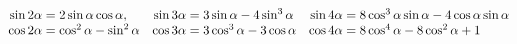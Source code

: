 \documentclass{article}
\begin{document}
\[ \begin{array}{@{}r@{\;=\;}l@{\quad}r@{\;=\;}l@{\quad}r@{\;=\;}l@{}}
    \sin2\alpha & 2\sin\alpha\cos\alpha, &
    \sin3\alpha & 3\sin\alpha-4\sin^3\alpha &
    \sin4\alpha & 8\cos^3\alpha\sin\alpha - 4\cos\alpha\sin\alpha\\
    \cos2\alpha & \cos^2\alpha - \sin^2\alpha &
    \cos3\alpha & 3\cos^3\alpha - 3\cos\alpha &
    \cos4\alpha & 8\cos^4\alpha - 8\cos^2\alpha + 1
   \end{array}  \]
\end{document}
